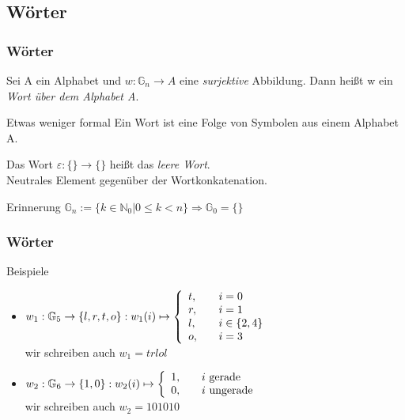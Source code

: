 \subsection{Wörter}
\begin{frame}
  \frametitle{Wörter}
  \begin{definition}
    Sei A ein Alphabet und $w: \mathbb{G}_n \rightarrow A$ eine \emph{surjektive} Abbildung. Dann heißt w ein \emph{Wort über dem Alphabet A}.
  \end{definition}\pause
  \begin{alertblock}{Etwas weniger formal}
    Ein Wort ist eine Folge von Symbolen aus einem Alphabet A.
  \end{alertblock}\pause
  \begin{definition}
    Das Wort $\varepsilon: \{\} \rightarrow \{\}$ heißt das \emph{leere Wort}. \\
    {\tiny Neutrales Element gegenüber der Wortkonkatenation.}
  \end{definition}\pause
  \begin{alertblock}{Erinnerung}
    $\mathbb{G}_n :=  \{k \in \mathbb{N}_0 | 0 \leq k < n\} \Rightarrow \mathbb{G}_0 = \{\}$
  \end{alertblock}
\end{frame}
\begin{frame}
  \frametitle{Wörter}
  \begin{exampleblock}{Beispiele}
    \begin{itemize}
      \item
      $
        w_1: \mathbb{G}_5 \rightarrow \{l, r, t, o\}: w_1(i) \mapsto \left\{
        \begin{array}{l l}
          t, & \quad i = 0\\
          r, & \quad i = 1\\
          l, & \quad i \in \{2, 4\}\\
          o, & \quad i = 3\\
        \end{array} \right.
      $ \\
      wir schreiben auch $w_1 = trlol$
      \item
      $
        w_2: \mathbb{G}_6 \rightarrow \{1, 0\}: w_2(i) \mapsto \left\{
        \begin{array}{l l}
          1, & \quad \text{$i$ gerade}\\
          0, & \quad \text{$i$ ungerade}\\
        \end{array} \right.
      $ \\
      wir schreiben auch $w_2 = 101010$
    \end{itemize}
  \end{exampleblock}
\end{frame}
